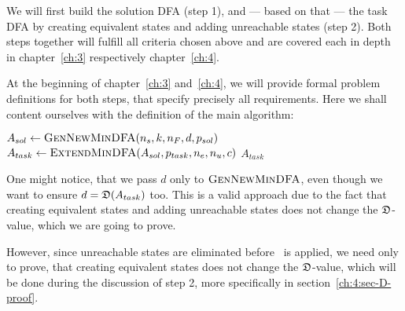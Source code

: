 We will first build the solution DFA (step 1), and --- based on that --- the task DFA by creating equivalent states and adding unreachable states (step 2). Both steps together will fulfill all criteria chosen above and are covered each in depth in chapter~\ref{ch:3} respectively chapter~\ref{ch:4}.

At the beginning of chapter~\ref{ch:3} and~\ref{ch:4}, we will provide formal problem definitions for both steps, that specify precisely all requirements. Here we shall content ourselves with the definition of the main algorithm:
\vspace{0.2cm}
\begin{algorithmic}[1]
	\State $A_{sol} \gets \textsc{GenNewMinDFA}({n_s}, k, {n_F}, d, p_{sol})$
	\State $A_{task} \gets \textsc{ExtendMinDFA}(A_{sol}, p_{task}, {n_e}, {n_u}, c)$
	\State \Return $A_{task}$
	\EndFunction
\end{algorithmic}
\vspace{0.2cm}
\noindent One might notice, that we pass $d$ only to $\textsc{GenNewMinDFA}$, even though we want to ensure $d = \mathfrak{D}(A_{task})$ too. This is a valid approach due to the fact that creating equivalent states and adding unreachable states does not change the $\mathfrak{D}$-value, which we are going to prove. 

However, since unreachable states are eliminated before \CompDist\ is applied, we need only to prove, that creating equivalent states does not change the $\mathfrak{D}$-value, which will be done during the discussion of step 2, more specifically in section~\ref{ch:4:sec-D-proof}.


